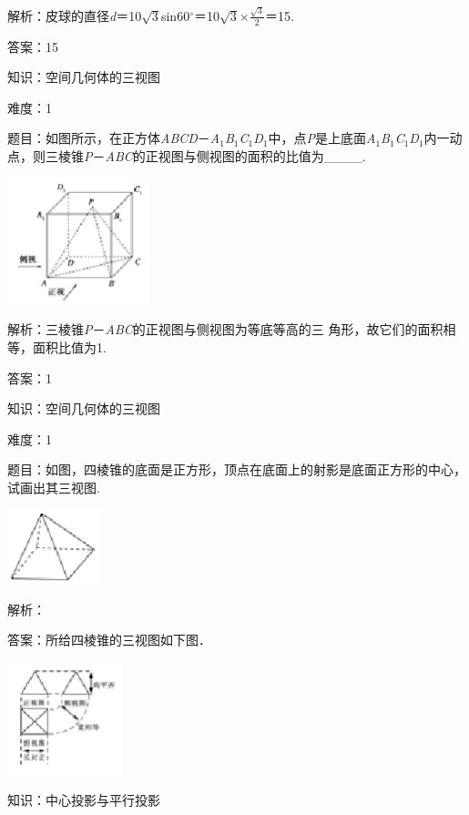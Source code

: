 \documentclass{article} %
\begin{document}
解析：皮球的直径\textit{d}＝10$\sqrt{3}$sin60$\mathrm{{}^\circ}$＝10$\sqrt{3}\mathrm{\times}\frac{\sqrt{3}}{2}$＝15.

答案：15

知识：空间几何体的三视图

难度：1

题目：如图所示，在正方体\textit{ABCD}－\textit{A}${}_{1}$\textit{B}${}_{1}$\textit{C}${}_{1}$\textit{D}${}_{1}$中，点\textit{P}是上底面\textit{A}${}_{1}$\textit{B}${}_{1}$\textit{C}${}_{1}$\textit{D}${}_{1}$内一动点，则三棱锥\textit{P}－\textit{ABC}的正视图与侧视图的面积的比值为\_\_\_\_.

\includegraphics*[width=1.63in, height=1.44in, keepaspectratio=false]{image33}

解析：三棱锥\textit{P}－\textit{ABC}的正视图与侧视图为等底等高的三
角形，故它们的面积相等，面积比值为1.

答案：1


知识：空间几何体的三视图

难度：1

题目：如图，四棱锥的底面是正方形，顶点在底面上的射影是底面正方形的中心，试画出其三视图.

\includegraphics*[width=1.06in, height=0.85in, keepaspectratio=false]{image34}

解析：

答案：所给四棱锥的三视图如下图．

\includegraphics*[width=1.32in, height=1.29in, keepaspectratio=false]{image35}

知识：中心投影与平行投影
\end{document}
